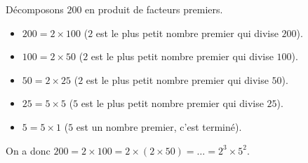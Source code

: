 	\begin{tip}[Exemple]
		Décomposons $200$ en produit de facteurs premiers.
		\begin{itemize}
			\item $200 = 2 \times 100$ ($2$ est le plus petit nombre premier qui divise $200$).
			\item $100 = 2 \times 50$ ($2$ est le plus petit nombre premier qui divise $100$).
			\item $50 = 2 \times 25$ ($2$ est le plus petit nombre premier qui divise $50$).
			\item $25 = 5 \times 5$ ($5$ est le plus petit nombre premier qui divise $25$).
			\item $5 = 5 \times 1$ ($5$ est un nombre premier, c'est terminé).
		\end{itemize}
		On a donc $200 = 2 \times 100 = 2 \times (2 \times 50) = \dots = 2^3 \times 5^2$.
	\end{tip}

